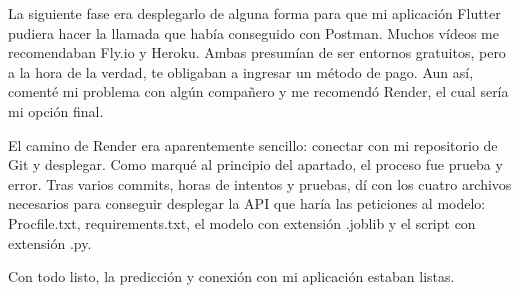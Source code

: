 	La siguiente fase era desplegarlo de alguna forma para que mi aplicación Flutter pudiera hacer la llamada que había conseguido con Postman. Muchos vídeos me recomendaban Fly.io y Heroku. Ambas presumían de ser entornos gratuitos, pero a la hora de la verdad, te obligaban a ingresar un método de pago. Aun así, comenté mi problema con algún compañero y me recomendó Render, el cual sería mi opción final.
	
	El camino de Render era aparentemente sencillo: conectar con mi repositorio de Git y desplegar. Como marqué al principio del apartado, el proceso fue prueba y error. Tras varios commits, horas de intentos y pruebas, dí con los cuatro archivos necesarios para conseguir desplegar la API que haría las peticiones al modelo: Procfile.txt, requirements.txt, el modelo con extensión .joblib y el script con extensión .py.
	
	Con todo listo, la predicción y conexión con mi aplicación estaban listas.
	

